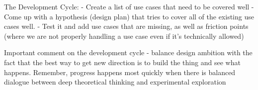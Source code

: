 The Development Cycle:
- Create a list of use cases that need to be covered well
- Come up with a hypothesis (design plan) that tries to cover all of the existing use cases well.
- Test it and add use cases that are missing, as well as friction points (where we are not properly handling a use case even if it's technically allowed)

Important comment on the development cycle - balance design ambition with the fact that the best way to get new direction is to build the thing and see what happens. Remember, progress happens most quickly when there is balanced dialogue between deep theoretical thinking and experimental exploration
